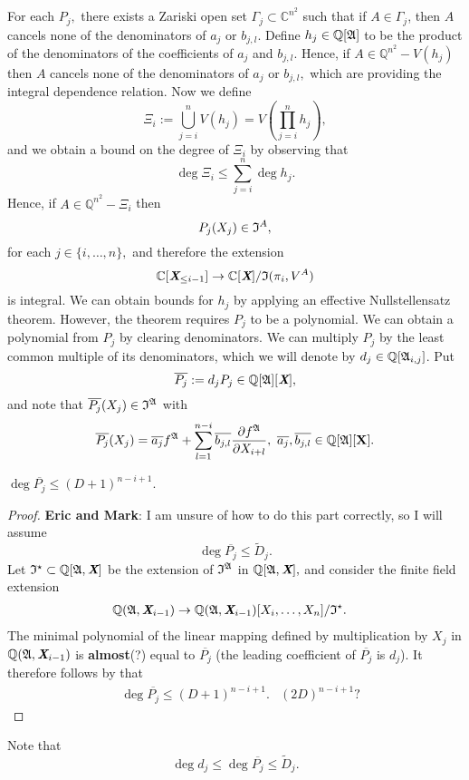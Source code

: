 \documentclass[sigconf]{acmart}
\def\Xb{\textit{\textbf{X}}}
\def\ajb{\overline{a_j}}
\def\bjb{\overline{b_{j,l}}}
\def\pjb{\overline{P_{j}}}
\def\C{\mathbb{C}}
\def\Q{\mathbb{Q}}
\def\Dt{\widetilde{D}}
\def\I{\frak{I}}
\def\Is{\frak{I}^{\star}}
\def\A{\frak{A}}
\begin{document}
For each $P_j,$ there exists a Zariski open set $\Gamma_j \subset \C^{n^2}$ such that if $A \in \Gamma_j$,
then $A$ cancels none of the denominators of $a_{j}$ or $b_{j,l}$. Define $h_j \in \Q[\A]$ to be the product of the denominators of the coefficients of $a_j$ and $b_{j,l}$. Hence, if $A \in \Q^{n^2}-V(h_j)$ then $A$ cancels none of the denominators of $a_{j}$ or $b_{j,l},$ which are providing the integral dependence relation. Now we define 
\[
\Xi_i := \bigcup_{j=i}^n V(h_j) =V\left(\prod_{j=i}^n h_j \right), 
\]
and we obtain a bound on the degree of $\Xi_i$ by observing that
\[
\deg \Xi_i \leq \sum_{j=i}^n \deg h_j.
\]
Hence, if $A\in \Q^{n^2}-\Xi_i$ then
\[
P_j(X_j) \in \I^A,  
\]
for each $j \in \{i,\hdots,n\},$ and therefore the extension 
\[
\mathbb{C}[{\Xb}_{\leq i-1}]\rightarrow\mathbb{C}[\Xb]/\I(\pi_i,V^{A})
\]
is integral. We can obtain bounds for $h_j$ by applying an effective Nullstellensatz theorem. However, the theorem requires $P_{j}$ to be a polynomial. We can obtain a polynomial from $P_{j}$ by clearing denominators. We can multiply $P_{j}$ by the least common multiple of its denominators, which we will denote by $d_j \in \Q[\A_{i,j}]$. Put 
\[
\overline{P_{j}} := d_jP_{j}\in \Q[\A][\textit{\textbf{X}}],
\]
and note that $\pjb(X_j) \in \I^{\A}$ with 
\[
\pjb(X_j) = \ajb f^{\A} + \sum_{l=1}^{n-i}\bjb \frac{\partial f^\A}{\partial X_{i+l}}, ~\ajb,\bjb \in \mathbb{Q}[\A][\textbf{X}].
\]
%
\begin{proposition} 
$\deg \pjb\leq (D+1)^{n-i+1}.$ 
\end{proposition} 
%
\begin{proof}
\textbf{Eric and Mark}: I am unsure of how to do this part correctly, so I will assume 
\[
\deg \pjb\leq \Dt_j.
\]
Let $\Is \subset \Q[\A,\Xb]$ be the extension of $\I^{\A}$ in  $\Q[\A,\Xb],$ and consider the finite field extension
%
\begin{align*}
    \Q(\A,\Xb_{i-1}) &\rightarrow \Q(\A,\Xb_{i-1})[X_i,\hdots,X_n]/\Is.
\end{align*}
%
The minimal polynomial of the linear mapping defined by multiplication by $X_j$ in $\Q(\A,\Xb_{i-1})$ is \textbf{almost}(?) equal to $\pjb$ (the leading coefficient of $\pjb$ is $d_j$). It therefore follows by \cite[Proposition 1]{CGR} that
%
\begin{align*}
&\deg \pjb \leq (D+1)^{n-i+1}.&(2D)^{n-i+1}\textrm{?} 
\end{align*}
%
\end{proof}
%
Note that 
\[
\deg d_j \leq \deg \pjb \leq \Dt_j.
\]
%
\end{document}
